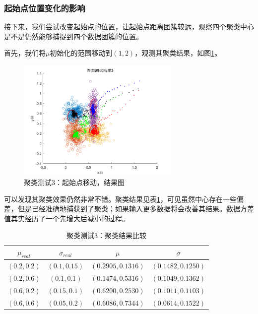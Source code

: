 \subsubsection{起始点位置变化的影响}
接下来，我们尝试改变起始点的位置，让起始点距离团簇较远，观察四个聚类中心是不是仍然能够捕捉到四个数据团簇的位置。

首先，我们将$\mu$初始化的范围移动到$(1,2)$，观测其聚类结果，如图\ref{fig:clustest3re}。

\begin{figure}[htbp]
   \centering
   \includegraphics[width=0.7\textwidth]{ClusterTest3Result.png} %
   \caption{聚类测试3：起始点移动，结果图}
   \label{fig:clustest3re}
\end{figure}

可以发现其聚类效果仍然非常不错。聚类结果见表\ref{tab:clustest3}，可见虽然中心存在一些偏差，但是已经准确地捕获到了聚类；如果输入更多数据将会改善其结果。数据方差值其实经历了一个先增大后减小的过程。
\begin{table}[htbp]
\centering
\begin{tabular}{c|c||c|c}
  \hline
  $\mu_{real}$   &  $\sigma_{real}$ &  $\mu$  &   $\sigma$\\
  \hline
  $(0.2,0.2)$    &  $(0.1,0.15)$   &  $(0.2905, 0.1316)$  & $(0.1482, 0.1250)$ \\
  $(0.2,0.6)$    &  $(0.1,0.1)$   &  $(0.1474, 0.5316)$  & $(0.1049, 0.1362)$ \\
  $(0.6,0.2)$    &  $(0.15,0.1)$   &  $(0.6200, 0.2530)$  & $(0.1011, 0.1103)$ \\
  $(0.6,0.6)$    &  $(0.05,0.2)$   &  $(0.6086, 0.7344)$  & $(0.0614, 0.1522)$ \\
  \hline
\end{tabular}
\caption{聚类测试3：聚类结果比较}
\label{tab:clustest3}
\end{table}

